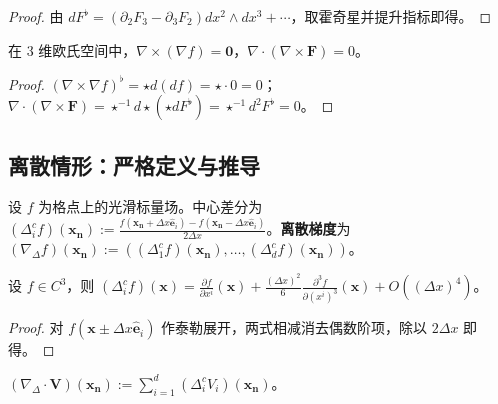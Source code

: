 \begin{proof}
由 $dF^\flat=(\partial_2F_3-\partial_3F_2)dx^2\wedge dx^3+\cdots$，取霍奇星并提升指标即得。
\end{proof}

\begin{proposition}[三大算子的恒等式]\label{prop:three_operator_identities}
在 $3$ 维欧氏空间中，$\nabla\times(\nabla f)=\mathbf{0}$，$\nabla\cdot(\nabla\times\mathbf{F})=0$。
\end{proposition}

\begin{proof}
$(\nabla\times\nabla f)^\flat=\star d(df)=\star\cdot 0=0$；$\nabla\cdot(\nabla\times\mathbf{F})=\star^{-1}d\star(\star dF^\flat)=\star^{-1}d^2F^\flat=0$。
\end{proof}

\subsection{离散情形：严格定义与推导}

\begin{definition}[离散梯度]\label{def:discrete_gradient_strict}
设 $f$ 为格点上的光滑标量场。中心差分为 $(\Delta_i^cf)(\mathbf{x}_{\mathbf{n}}):=\frac{f(\mathbf{x}_{\mathbf{n}}+\Delta x\hat{\mathbf{e}}_i)-f(\mathbf{x}_{\mathbf{n}}-\Delta x\hat{\mathbf{e}}_i)}{2\Delta x}$。\textbf{离散梯度}为 $(\nabla_{\Delta}f)(\mathbf{x}_{\mathbf{n}}):=((\Delta_1^cf)(\mathbf{x}_{\mathbf{n}}),\dots,(\Delta_d^cf)(\mathbf{x}_{\mathbf{n}}))$。
\end{definition}

\begin{proposition}[离散梯度的误差估计]\label{prop:discrete_gradient_error}
设 $f\in C^3$，则 $(\Delta_i^cf)(\mathbf{x})=\frac{\partial f}{\partial x^i}(\mathbf{x})+\frac{(\Delta x)^2}{6}\frac{\partial^3f}{\partial(x^i)^3}(\mathbf{x})+O((\Delta x)^4)$。
\end{proposition}

\begin{proof}
对 $f(\mathbf{x}\pm\Delta x\hat{\mathbf{e}}_i)$ 作泰勒展开，两式相减消去偶数阶项，除以 $2\Delta x$ 即得。
\end{proof}

\begin{definition}[离散散度]\label{def:discrete_divergence_strict}
$(\nabla_{\Delta}\cdot\mathbf{V})(\mathbf{x}_{\mathbf{n}}):=\sum_{i=1}^d(\Delta_i^cV_i)(\mathbf{x}_{\mathbf{n}})$。
\end{definition}

